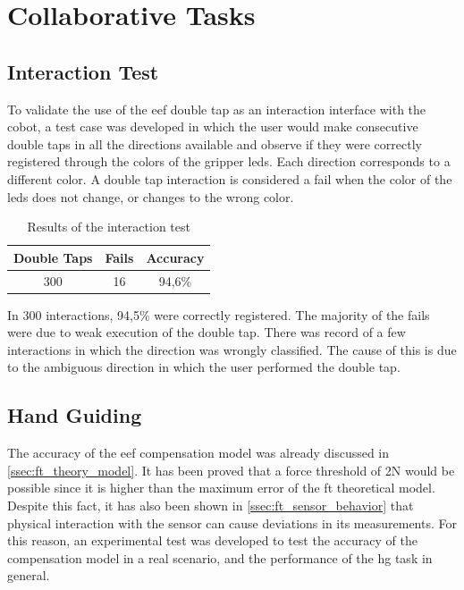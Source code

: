 \section{Collaborative Tasks}


\subsection{Interaction Test}

\par To validate the use of the \ac{eef} double tap as an interaction interface with the cobot, a test case was developed in which the user would make consecutive double taps in all the directions available and observe if they were correctly registered through the colors of the gripper \acsp{led}. Each direction corresponds to a different color. A double tap interaction is considered a fail when the color of the \acsp{led} does not change, or changes to the wrong color.

\begin{table}[h]
    \centering
    \begin{tabular}{|c|c|c|}
    \hline
    \textbf{Double Taps} & \textbf{Fails} & \textbf{Accuracy} \\ \hline
    300 & 16 & 94,6\% \\ \hline
    \end{tabular}
    \caption{Results of the interaction test}
    \label{tab:interaction_test}
\end{table}

\par In 300 interactions, 94,5\% were correctly registered. The majority of the fails were due to weak execution of the double tap. There was record of a few interactions in which the direction was wrongly classified. The cause of this is due to the ambiguous direction in which the user performed the double tap.



\subsection{Hand Guiding}

\par The accuracy of the \ac{eef} compensation model was already discussed in \autoref{ssec:ft_theory_model}. It has been proved that a force threshold of 2N would be possible since it is higher than the maximum error of the \ac{ft} theoretical model. Despite this fact, it has also been shown in \autoref{ssec:ft_sensor_behavior} that physical interaction with the sensor can cause deviations in its measurements. For this reason, an experimental test was developed to test the accuracy of the compensation model in a real scenario, and the performance of the \ac{hg} task in general.

